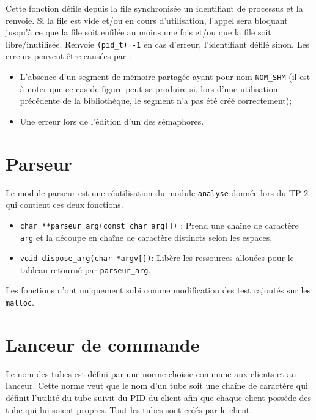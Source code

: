 \documentclass[12pt]{article}
\begin{document}
    Cette fonction défile depuis la file synchronisée un identifiant de processus et la renvoie. Si la file est vide et/ou en cours d'utilisation, l'appel sera bloquant jusqu'à ce que la file soit enfilée au moins une fois et/ou que la file soit libre/inutilisée.
    Renvoie \texttt{(pid\_t) -1} en cas d'erreur, l'identifiant défilé sinon. Les erreurs peuvent être causées par :
    \begin{itemize}
        \item L'absence d'un segment de mémoire partagée ayant pour nom \texttt{NOM\_SHM} (il est à noter que ce cas de figure peut se produire si, lors d'une utilisation précédente de la bibliothèque, le segment n'a pas été créé correctement);
        \item Une erreur lors de l'édition d'un des sémaphores.
    \end{itemize}


    \section{Parseur}
    Le module parseur est une réutilisation du module \texttt{analyse} donnée lors
    du TP 2 qui contient ces deux fonctions.

    \begin{itemize}
        \item \texttt{char **parseur\_arg(const char arg[])} : Prend une chaîne de caractère \texttt{arg} et la découpe en chaîne de caractère distincts selon les espaces.

        \item \texttt{void dispose\_arg(char *argv[])}: Libère les ressources allouées pour le tableau retourné par \texttt{parseur\_arg}.
    \end{itemize}
    Les fonctions n'ont uniquement subi comme modification des test rajoutés sur les \texttt{malloc}.


    \section{Lanceur de commande}
    Le nom des tubes est défini par une norme choisie commune aux clients et au lanceur. Cette norme veut que le nom d'un tube soit une chaîne de caractère qui définit l'utilité du tube suivit du PID du client afin que chaque client
    possède des tube qui lui soient propres. Tout les tubes sont créés par le client.
\end{document}
